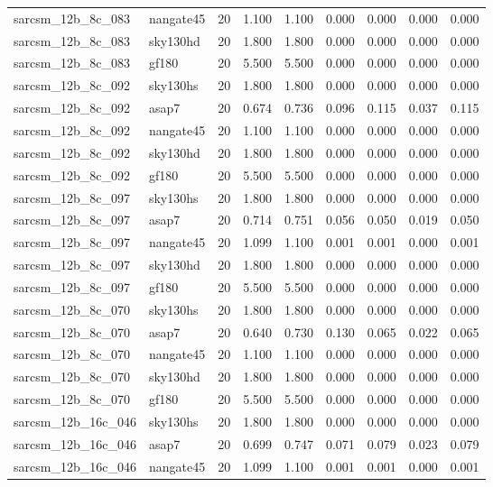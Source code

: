 \begin{tabular}{llrrrrrrr}
sarcsm\_12b\_8c\_083 & nangate45 & 20 & 1.100 & 1.100 & 0.000 & 0.000 & 0.000 & 0.000 \\
sarcsm\_12b\_8c\_083 & sky130hd & 20 & 1.800 & 1.800 & 0.000 & 0.000 & 0.000 & 0.000 \\
sarcsm\_12b\_8c\_083 & gf180 & 20 & 5.500 & 5.500 & 0.000 & 0.000 & 0.000 & 0.000 \\
sarcsm\_12b\_8c\_092 & sky130hs & 20 & 1.800 & 1.800 & 0.000 & 0.000 & 0.000 & 0.000 \\
sarcsm\_12b\_8c\_092 & asap7 & 20 & 0.674 & 0.736 & 0.096 & 0.115 & 0.037 & 0.115 \\
sarcsm\_12b\_8c\_092 & nangate45 & 20 & 1.100 & 1.100 & 0.000 & 0.000 & 0.000 & 0.000 \\
sarcsm\_12b\_8c\_092 & sky130hd & 20 & 1.800 & 1.800 & 0.000 & 0.000 & 0.000 & 0.000 \\
sarcsm\_12b\_8c\_092 & gf180 & 20 & 5.500 & 5.500 & 0.000 & 0.000 & 0.000 & 0.000 \\
sarcsm\_12b\_8c\_097 & sky130hs & 20 & 1.800 & 1.800 & 0.000 & 0.000 & 0.000 & 0.000 \\
sarcsm\_12b\_8c\_097 & asap7 & 20 & 0.714 & 0.751 & 0.056 & 0.050 & 0.019 & 0.050 \\
sarcsm\_12b\_8c\_097 & nangate45 & 20 & 1.099 & 1.100 & 0.001 & 0.001 & 0.000 & 0.001 \\
sarcsm\_12b\_8c\_097 & sky130hd & 20 & 1.800 & 1.800 & 0.000 & 0.000 & 0.000 & 0.000 \\
sarcsm\_12b\_8c\_097 & gf180 & 20 & 5.500 & 5.500 & 0.000 & 0.000 & 0.000 & 0.000 \\
sarcsm\_12b\_8c\_070 & sky130hs & 20 & 1.800 & 1.800 & 0.000 & 0.000 & 0.000 & 0.000 \\
sarcsm\_12b\_8c\_070 & asap7 & 20 & 0.640 & 0.730 & 0.130 & 0.065 & 0.022 & 0.065 \\
sarcsm\_12b\_8c\_070 & nangate45 & 20 & 1.100 & 1.100 & 0.000 & 0.000 & 0.000 & 0.000 \\
sarcsm\_12b\_8c\_070 & sky130hd & 20 & 1.800 & 1.800 & 0.000 & 0.000 & 0.000 & 0.000 \\
sarcsm\_12b\_8c\_070 & gf180 & 20 & 5.500 & 5.500 & 0.000 & 0.000 & 0.000 & 0.000 \\
sarcsm\_12b\_16c\_046 & sky130hs & 20 & 1.800 & 1.800 & 0.000 & 0.000 & 0.000 & 0.000 \\
sarcsm\_12b\_16c\_046 & asap7 & 20 & 0.699 & 0.747 & 0.071 & 0.079 & 0.023 & 0.079 \\
sarcsm\_12b\_16c\_046 & nangate45 & 20 & 1.099 & 1.100 & 0.001 & 0.001 & 0.000 & 0.001 \\

\end{tabular}
